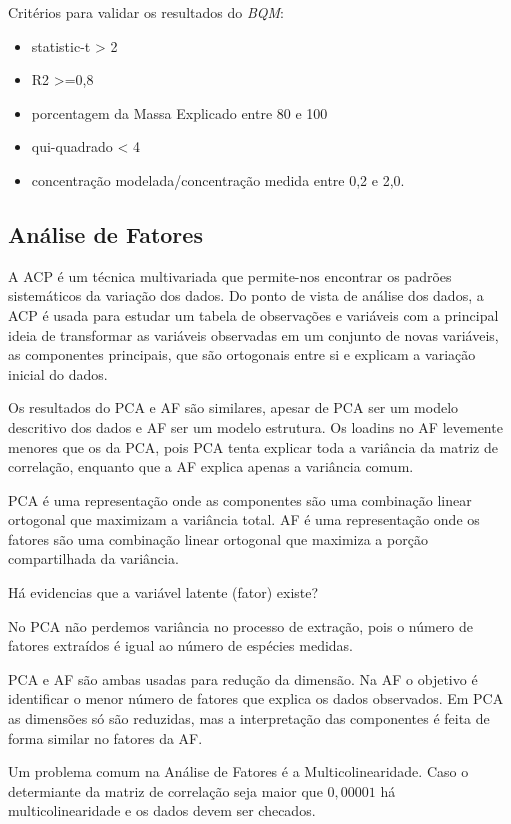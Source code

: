 
Critérios para validar os resultados do \textit{BQM}:
\begin{itemize}
  \item statistic-t > 2
  \item R2 >=0,8
  \item porcentagem da Massa Explicado entre 80 e 100 
  \item qui-quadrado < 4
  \item concentração modelada/concentração medida entre 0,2 e 2,0.
\end{itemize}

\subsection{Análise de Fatores}

A ACP é um técnica multivariada que permite-nos encontrar os padrões 
sistemáticos da variação dos dados. 
Do ponto de vista de análise dos dados, a ACP é usada para estudar um 
tabela de observações e variáveis com a principal ideia de transformar 
as variáveis observadas em um conjunto de novas variáveis, 
as componentes principais, que são ortogonais entre si 
e explicam a variação inicial do dados.

Os resultados do PCA e AF são similares, apesar de PCA ser um modelo
descritivo dos dados e AF ser um modelo estrutura. 
Os loadins no AF levemente menores que os da PCA, pois PCA tenta
explicar toda a variância da matriz de correlação, enquanto que a AF
explica apenas a variância comum. 

PCA é uma representação onde as componentes são uma combinação linear 
ortogonal que maximizam a variância total.
AF é uma representação onde os fatores são uma combinação linear ortogonal
que maximiza a porção compartilhada da variância. 

Há evidencias que a variável latente (fator) existe?

No PCA não perdemos variância no processo de extração, pois 
o número de fatores extraídos é igual ao número de espécies medidas.

PCA e AF são ambas usadas para redução da dimensão. 
Na AF o objetivo é identificar o menor número de fatores que explica os 
dados observados. Em PCA as dimensões só são reduzidas, mas a 
interpretação das componentes é feita de forma similar no fatores da AF.

Um problema comum na Análise de Fatores é a Multicolinearidade. 
Caso o determiante da matriz de correlação seja maior que $0,00001$ 
há multicolinearidade e os dados devem ser checados. 

